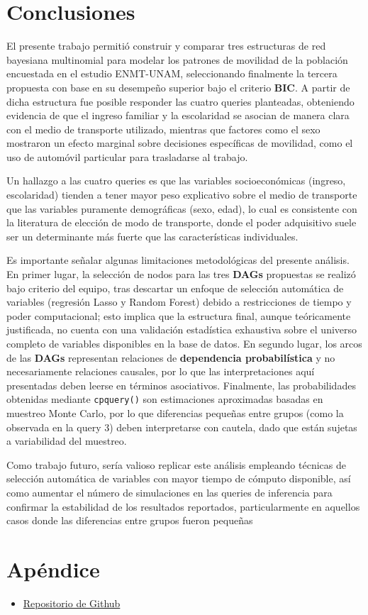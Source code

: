\documentclass[12pt,a4paper]{article}
\begin{document}
\section{Conclusiones}
El presente trabajo permitió construir y comparar tres estructuras de red bayesiana multinomial para modelar los patrones de movilidad de la población encuestada en el estudio ENMT-UNAM, seleccionando finalmente la tercera propuesta con base en su desempeño superior bajo el criterio \textbf{BIC}. A partir de dicha estructura fue posible responder las cuatro queries planteadas, obteniendo evidencia de que el ingreso familiar y la escolaridad se asocian de manera clara con el medio de transporte utilizado, mientras que factores como el sexo mostraron un efecto marginal sobre decisiones específicas de movilidad, como el uso de automóvil particular para trasladarse al trabajo.

Un hallazgo a las cuatro queries es que las variables socioeconómicas (ingreso, escolaridad) tienden a tener mayor peso explicativo sobre el medio de transporte que las variables puramente demográficas (sexo, edad), lo cual es consistente con la literatura de elección de modo de transporte, donde el poder adquisitivo suele ser un determinante más fuerte que las características individuales.

Es importante señalar algunas limitaciones metodológicas del presente análisis. En primer lugar, la selección de nodos para las tres \textbf{DAGs} propuestas se realizó bajo criterio del equipo, tras descartar un enfoque de selección automática de variables (regresión Lasso y Random Forest) debido a restricciones de tiempo y poder computacional; esto implica que la estructura final, aunque teóricamente justificada, no cuenta con una validación estadística exhaustiva sobre el universo completo de variables disponibles en la base de datos. En segundo lugar, los arcos de las \textbf{DAGs} representan relaciones de \textbf{dependencia probabilística} y no necesariamente relaciones causales, por lo que las interpretaciones aquí presentadas deben leerse en términos asociativos. Finalmente, las probabilidades obtenidas mediante \texttt{cpquery()} son estimaciones aproximadas basadas en muestreo Monte Carlo, por lo que diferencias pequeñas entre grupos (como la observada en la query 3) deben interpretarse con cautela, dado que están sujetas a variabilidad del muestreo.

Como trabajo futuro, sería valioso replicar este análisis empleando técnicas de selección automática de variables con mayor tiempo de cómputo disponible, así como aumentar el número de simulaciones en las queries de inferencia para confirmar la estabilidad de los resultados reportados, particularmente en aquellos casos donde las diferencias entre grupos fueron pequeñas

\section{Apéndice}
\begin{itemize}
    \item \href{https://github.com/KibaSpark/bayesian-networks-enmt}{ Repositorio de Github}
\end{itemize}
\end{document}
